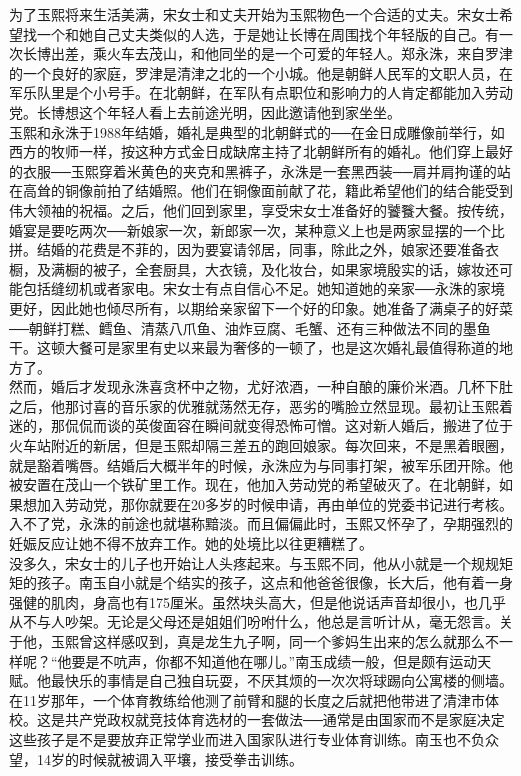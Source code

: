 为了玉熙将来生活美满，宋女士和丈夫开始为玉熙物色一个合适的丈夫。宋女士希望找一个和她自己丈夫类似的人选，于是她让长博在周围找个年轻版的自己。有一次长博出差，乘火车去茂山，和他同坐的是一个可爱的年轻人。郑永洙，来自罗津的一个良好的家庭，罗津是清津之北的一个小城。他是朝鲜人民军的文职人员，在军乐队里是个小号手。在北朝鲜，在军队有点职位和影响力的人肯定都能加入劳动党。长博想这个年轻人看上去前途光明，因此邀请他到家坐坐。\\

玉熙和永洙于1988年结婚，婚礼是典型的北朝鲜式的──在金日成雕像前举行，如西方的牧师一样，按这种方式金日成缺席主持了北朝鲜所有的婚礼。他们穿上最好的衣服──玉熙穿着米黄色的夹克和黑裤子，永洙是一套黑西装──肩并肩拘谨的站在高耸的铜像前拍了结婚照。他们在铜像面前献了花，籍此希望他们的结合能受到伟大领袖的祝福。之后，他们回到家里，享受宋女士准备好的饕餮大餐。按传统，婚宴是要吃两次──新娘家一次，新郎家一次，某种意义上也是两家显摆的一个比拼。结婚的花费是不菲的，因为要宴请邻居，同事，除此之外，娘家还要准备衣橱，及满橱的被子，全套厨具，大衣镜，及化妆台，如果家境殷实的话，嫁妆还可能包括缝纫机或者家电。宋女士有点自信心不足。她知道她的亲家──永洙的家境更好，因此她也倾尽所有，以期给亲家留下一个好的印象。她准备了满桌子的好菜──朝鲜打糕、鳕鱼、清蒸八爪鱼、油炸豆腐、毛蟹、还有三种做法不同的墨鱼干。这顿大餐可是家里有史以来最为奢侈的一顿了，也是这次婚礼最值得称道的地方了。\\

然而，婚后才发现永洙喜贪杯中之物，尤好浓酒，一种自酿的廉价米酒。几杯下肚之后，他那讨喜的音乐家的优雅就荡然无存，恶劣的嘴脸立然显现。最初让玉熙着迷的，那侃侃而谈的英俊面容在瞬间就变得恐怖可憎。这对新人婚后，搬进了位于火车站附近的新居，但是玉熙却隔三差五的跑回娘家。每次回来，不是黑着眼圈，就是豁着嘴唇。结婚后大概半年的时候，永洙应为与同事打架，被军乐团开除。他被安置在茂山一个铁矿里工作。现在，他加入劳动党的希望破灭了。在北朝鲜，如果想加入劳动党，那你就要在20多岁的时候申请，再由单位的党委书记进行考核。入不了党，永洙的前途也就堪称黯淡。而且偏偏此时，玉熙又怀孕了，孕期强烈的妊娠反应让她不得不放弃工作。她的处境比以往更糟糕了。\\

没多久，宋女士的儿子也开始让人头疼起来。与玉熙不同，他从小就是一个规规矩矩的孩子。南玉自小就是个结实的孩子，这点和他爸爸很像，长大后，他有着一身强健的肌肉，身高也有175厘米。虽然块头高大，但是他说话声音却很小，也几乎从不与人吵架。无论是父母还是姐姐们吩咐什么，他总是言听计从，毫无怨言。关于他，玉熙曾这样感叹到，真是龙生九子啊，同一个爹妈生出来的怎么就那么不一样呢？“他要是不吭声，你都不知道他在哪儿。”南玉成绩一般，但是颇有运动天赋。他最快乐的事情是自己独自玩耍，不厌其烦的一次次将球踢向公寓楼的侧墙。在11岁那年，一个体育教练给他测了前臂和腿的长度之后就把他带进了清津市体校。这是共产党政权就竞技体育选材的一套做法──通常是由国家而不是家庭决定这些孩子是不是要放弃正常学业而进入国家队进行专业体育训练。南玉也不负众望，14岁的时候就被调入平壤，接受拳击训练。\\

